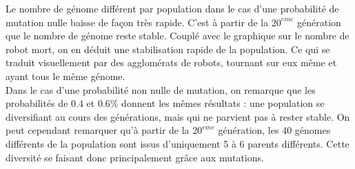 \documentclass[a4paper]{article}
\begin{document}
Le nombre de génome différent par population dans le cas d'une probabilité de mutation nulle baisse de façon très rapide. C'est à partir de la $20^{eme}$ génération que le nombre de génome reste stable. Couplé avec le graphique sur le nombre de robot mort, on en déduit une stabilisation rapide de la population. Ce qui se traduit visuellement par des agglomérats de robots, tournant sur eux même et ayant tous le même génome.\\
Dans le cas d'une probabilité non nulle de mutation, on remarque que les probabilités de 0.4 et 0.6\% donnent les mêmes résultats : une population se diversifiant au cours des générations, mais qui ne parvient pas à rester stable. On peut cependant remarquer qu'à partir de la $20^{eme}$ génération, les 40 génomes différents de la population sont issus d'uniquement 5 à 6 parents différents. Cette diversité se faisant donc principalement grâce aux mutations.
\newpage
\end{document}
